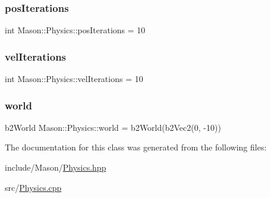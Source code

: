 \subsubsection{\texorpdfstring{pos\+Iterations}{posIterations}}
{\footnotesize\ttfamily int Mason\+::\+Physics\+::pos\+Iterations = 10}

\hypertarget{class_mason_1_1_physics_ab93e9c5caf8cb0964ceedc2161fac86d}{}\label{class_mason_1_1_physics_ab93e9c5caf8cb0964ceedc2161fac86d} 
\subsubsection{\texorpdfstring{vel\+Iterations}{velIterations}}
{\footnotesize\ttfamily int Mason\+::\+Physics\+::vel\+Iterations = 10}

\hypertarget{class_mason_1_1_physics_a7740dc3712e10eb4258774b76daeb2f6}{}\label{class_mason_1_1_physics_a7740dc3712e10eb4258774b76daeb2f6} 
\subsubsection{\texorpdfstring{world}{world}}
{\footnotesize\ttfamily b2\+World Mason\+::\+Physics\+::world = b2\+World(b2\+Vec2(0, -\/10))}



The documentation for this class was generated from the following files\+:\begin{DoxyCompactItemize}
\item 
include/\+Mason/\hyperlink{_physics_8hpp}{Physics.\+hpp}\item 
src/\hyperlink{_physics_8cpp}{Physics.\+cpp}\end{DoxyCompactItemize}
